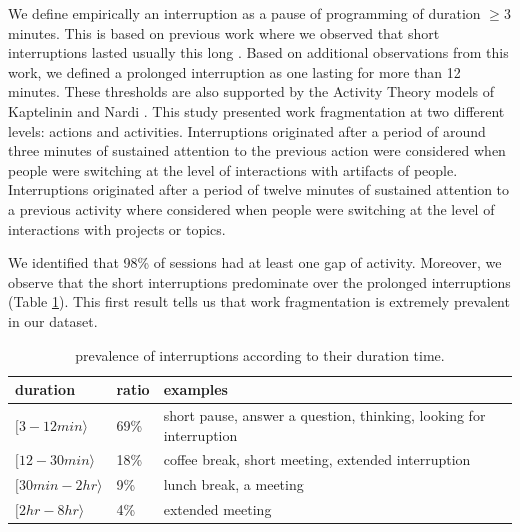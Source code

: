 \documentclass[times]{smrauth}
\begin{document}
We define empirically an interruption as a pause of programming of duration $\geq 3$ minutes. 
This is based on previous work where we observed that short interruptions lasted usually this long \cite{GM04}. 
Based on additional observations from this work, we defined a prolonged interruption as one lasting for more than 12 minutes. 
These thresholds are also supported by the Activity Theory models of Kaptelinin and Nardi \cite{KaptelininN07}. This study presented work fragmentation at two different levels: actions and activities. Interruptions originated after a period of around three minutes of sustained attention to the previous action were considered when people were switching at the level of interactions with artifacts of people. Interruptions originated after a period of twelve minutes of sustained attention to a previous activity where considered when people were switching at the level of interactions with projects or topics.  

We identified that 98\% of sessions had at least one gap of activity. Moreover, we observe that the short interruptions predominate over the prolonged interruptions (Table \ref{tbl:by_duration}). This first result tells us that work fragmentation is extremely prevalent in our dataset.

\begin{table}[ht!]
\tiny
\renewcommand{\arraystretch}{1.3}
\caption{prevalence of interruptions according to their duration time. }
\label{tbl:by_duration}
\centering
\begin{tabular}{p{3cm}|p{0.8cm}|p{4cm}} 
duration & ratio & examples  \\
  \hline   
$[3  - 12 min \rangle$ & 69\% & short pause, answer a question, thinking, looking for interruption  \\ 
\hline 
$[12  - 30 min \rangle$ & 18\% & coffee break, short meeting, extended interruption  \\
$[30 min - 2 hr \rangle$  & 9\% & lunch break, a meeting  \\
$[2 hr - 8 hr \rangle$ & 4\% & extended meeting \\
\end{tabular}
\end{table}
\end{document}
